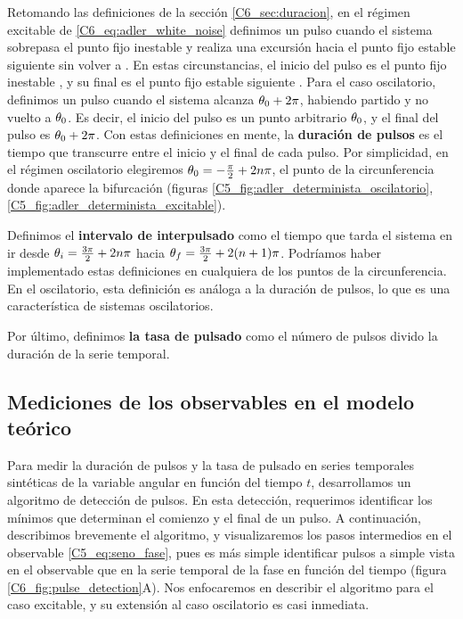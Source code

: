 \documentclass[./main.tex]{subfiles}
\begin{document}
Retomando las definiciones de la sección \ref{C6_sec:duracion}, en el régimen excitable de \ref{C6_eq:adler_white_noise} definimos un pulso cuando el sistema sobrepasa el punto fijo inestable \xxi y realiza una excursión hacia el punto fijo estable siguiente \xxe sin volver a \xxi. En estas circunstancias, el inicio del pulso es el punto fijo inestable \xxi, y su final es el punto fijo estable siguiente \xxe.  Para el caso oscilatorio, definimos un pulso cuando el sistema alcanza $\theta_0+2\pi$, habiendo partido y no vuelto a $\theta_0$.  Es decir, el inicio del pulso es un punto arbitrario $\theta_0$, y el final del pulso es $\theta_0+2\pi$. Con estas definiciones en mente, la \textbf{duración de pulsos} es el tiempo que transcurre entre el inicio y el final de cada pulso. Por simplicidad, en el régimen oscilatorio elegiremos $\theta_0 = -\frac{\pi}{2} + 2n\pi$, el punto de la circunferencia donde aparece la bifurcación (figuras \ref{C5_fig:adler_determinista_oscilatorio},\ref{C5_fig:adler_determinista_excitable}). 

Definimos el \textbf{intervalo de interpulsado} como el tiempo que tarda el sistema en ir desde $\theta_i = \frac{3\pi}{2} + 2n\pi$ hacia $\theta_f = \frac{3\pi}{2} + 2(n+1)\pi$. Podríamos haber implementado estas definiciones en cualquiera de los puntos de la circunferencia. En el oscilatorio, esta definición es análoga a la duración de pulsos, lo que es una característica de sistemas oscilatorios.   

Por último, definimos \textbf{la tasa de pulsado} como el número de pulsos divido la duración de la serie temporal.  

\subsection{Mediciones de los observables en el modelo teórico}
\label{C6_ssec:deteccion_de_pulsos}

Para medir la duración de pulsos y la tasa de pulsado en series temporales sintéticas de la variable angular \xx en función del tiempo $t$, desarrollamos un algoritmo de detección de pulsos. En esta detección, requerimos identificar los mínimos que determinan el comienzo y el final de un pulso. A continuación, describimos brevemente el algoritmo, y visualizaremos los pasos intermedios en el observable \ref{C5_eq:seno_fase}, pues es más simple identificar pulsos a simple vista en el observable que en la serie temporal de la fase en función del tiempo (figura \ref{C6_fig:pulse_detection}A). Nos enfocaremos en describir el algoritmo para el caso excitable, y su extensión al caso oscilatorio es casi inmediata.
\end{document}

